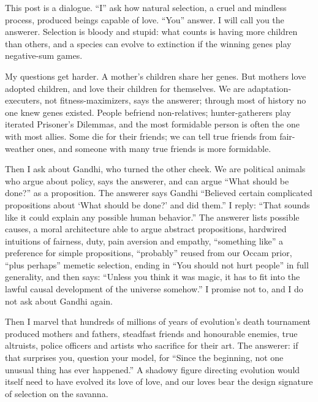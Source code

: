 
This post is a dialogue. ``I'' ask how natural selection, a cruel and mindless process, produced beings capable of love. ``You'' answer. I will call you the answerer. Selection is bloody and stupid: what counts is having more children than others, and a species can evolve to extinction if the winning genes play negative-sum games. 

My questions get harder. A mother's children share her genes. But mothers love adopted children, and love their children for themselves. We are adaptation-executers, not fitness-maximizers, says the answerer; through most of history no one knew genes existed. People befriend non-relatives; hunter-gatherers play iterated Prisoner's Dilemmas, and the most formidable person is often the one with most allies. Some die for their friends; we can tell true friends from fair-weather ones, and someone with many true friends is more formidable.

Then I ask about Gandhi, who turned the other cheek. We are political animals who argue about policy, says the answerer, and can argue ``What should be done?'' as a proposition. The answerer says Gandhi ``Believed certain complicated propositions about `What should be done?' and did them.'' I reply: ``That sounds like it could explain any possible human behavior.'' The answerer lists possible causes, a moral architecture able to argue abstract propositions, hardwired intuitions of fairness, duty, pain aversion and empathy, ``something like'' a preference for simple propositions, ``probably'' reused from our Occam prior, ``plus perhaps'' memetic selection, ending in ``You should not hurt people'' in full generality, and then says: ``Unless you think it was magic, it has to fit into the lawful causal development of the universe somehow.''  I promise not to, and I do not ask about Gandhi again.

Then I marvel that hundreds of millions of years of evolution's death tournament produced mothers and fathers, steadfast friends and honourable enemies, true altruists, police officers and artists who sacrifice for their art. The answerer: if that surprises you, question your model, for ``Since the beginning, not one unusual thing has ever happened.'' A shadowy figure directing evolution would itself need to have evolved its love of love, and our loves bear the design signature of selection on the savanna.

